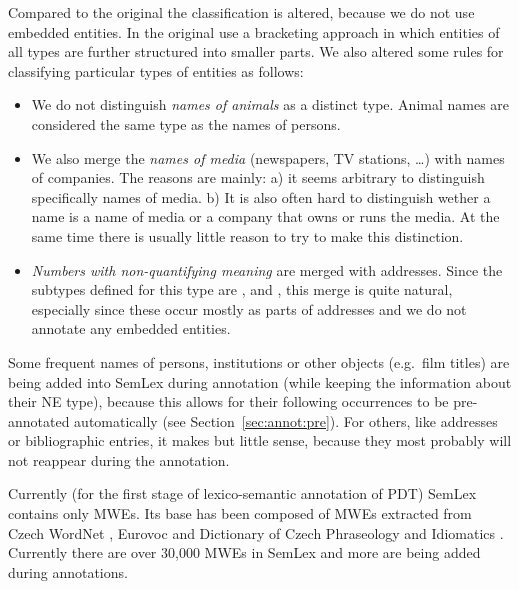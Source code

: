 Compared to the original the classification is altered, because we do not use embedded entities. In the original \citeauthor{sevcikova:2007} use a bracketing approach in which entities of all types are further structured into smaller parts. We also altered some rules for classifying particular types of entities as follows:
\begin{itemize}
\item  We do not distinguish \emph{names of animals} as a distinct type. Animal names are considered the same type as the names of persons.
\item We also merge the \emph{names of media} (newspapers, TV stations, \ldots) with names of companies. The reasons are mainly: a) it seems arbitrary to distinguish specifically names of media. b) It is also often hard to distinguish wether a name is a name of media or a company that owns or runs the media. At the same time there is usually little reason to try to make this distinction.
\item \emph{Numbers with non-quantifying meaning} are merged with addresses. Since the subtypes defined for this type are ,  and , this merge is quite natural, especially since these occur mostly as parts of addresses and we do not annotate any embedded entities.
\end{itemize}

Some frequent names of persons, institutions or other objects (e.g.~film titles) are being added into SemLex during annotation (while keeping the information about their NE type), because this allows for their following occurrences to be pre-annotated automatically (see Section~\ref{sec:annot:pre}). For others, like addresses or bibliographic entries, it makes but little sense, because they most probably will not reappear during the annotation. 

Currently (for the first stage of lexico-semantic annotation of PDT) SemLex contains only MWEs. Its base has been composed of MWEs extracted from Czech WordNet \citep{smrz:03}, Eurovoc \citep{eurovoc:07} and Dictionary of Czech Phraseology and Idiomatics \citep{cermak:1988}.%
Currently there are over 30,000 MWEs in SemLex and more are being added during annotations.


